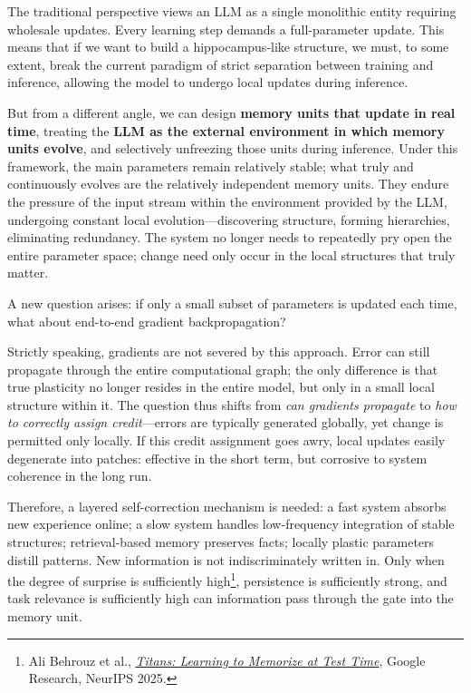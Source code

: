 The traditional perspective views an LLM as a single monolithic entity requiring wholesale updates. Every learning step demands a full-parameter update. This means that if we want to build a hippocampus-like structure, we must, to some extent, break the current paradigm of strict separation between training and inference, allowing the model to undergo local updates during inference.

But from a different angle, we can design \textbf{memory units that update in real time}, treating the \textbf{LLM as the external environment in which memory units evolve}, and selectively unfreezing those units during inference. Under this framework, the main parameters remain relatively stable; what truly and continuously evolves are the relatively independent memory units. They endure the pressure of the input stream within the environment provided by the LLM, undergoing constant local evolution---discovering structure, forming hierarchies, eliminating redundancy. The system no longer needs to repeatedly pry open the entire parameter space; change need only occur in the local structures that truly matter.

\vspace{1em}

A new question arises: if only a small subset of parameters is updated each time, what about end-to-end gradient backpropagation?

Strictly speaking, gradients are not severed by this approach. Error can still propagate through the entire computational graph; the only difference is that true plasticity no longer resides in the entire model, but only in a small local structure within it. The question thus shifts from \textit{can gradients propagate} to \textit{how to correctly assign credit}---errors are typically generated globally, yet change is permitted only locally. If this credit assignment goes awry, local updates easily degenerate into patches: effective in the short term, but corrosive to system coherence in the long run.

Therefore, a layered self-correction mechanism is needed: a fast system absorbs new experience online; a slow system handles low-frequency integration of stable structures; retrieval-based memory preserves facts; locally plastic parameters distill patterns. New information is not indiscriminately written in. Only when the degree of surprise is sufficiently high\footnote{Ali Behrouz et al., \href{https://arxiv.org/abs/2501.00663}{\textit{Titans: Learning to Memorize at Test Time}}, Google Research, NeurIPS 2025.}, persistence is sufficiently strong, and task relevance is sufficiently high can information pass through the gate into the memory unit.

